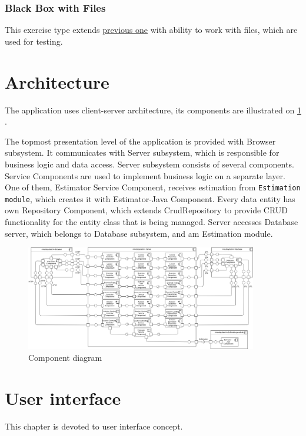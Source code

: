             \subsubsection{Black Box with Files}
            This exercise type extends \hyperref[subsubsec:blackbox]{previous one} with ability to work with files, which are used for testing.


    \section{Architecture}
    The application uses client-server architecture, its components are illustrated on \ref{fig:component-diagram} .
    
    The topmost presentation level of the application is provided with Browser subsystem. It communicates with Server subsystem, which is responsible for business logic and data access. Server subsystem consists of several components. Service Components are used to implement business logic on a separate layer. One of them, Estimator Service Component, receives estimation from \texttt{Estimation module}, which creates it with Estimator-Java Component. Every data entity has own Repository Component, which extends CrudRepository to provide CRUD functionality for the entity class that is being managed. Server accesses Database server, which belongs to Database subsystem, and am Estimation module.
    
    \begin{figure}
    \centerline{
        \includegraphics[width=0.9\textwidth, width=\linewidth]
        {images/component-diagram.png}}
    \caption{Component diagram}
    \label{fig:component-diagram}
    \end{figure}

    \section{User interface}
    This chapter is devoted to user interface concept.
    
